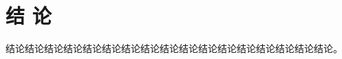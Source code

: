 \frontmatter {}  %

\backmatter
\chapter*{结\texorpdfstring{\qquad}{} 论}
\thispagestyle{main}

结论结论结论结论结论结论结论结论结论结论结论结论结论结论结论结论结论。
